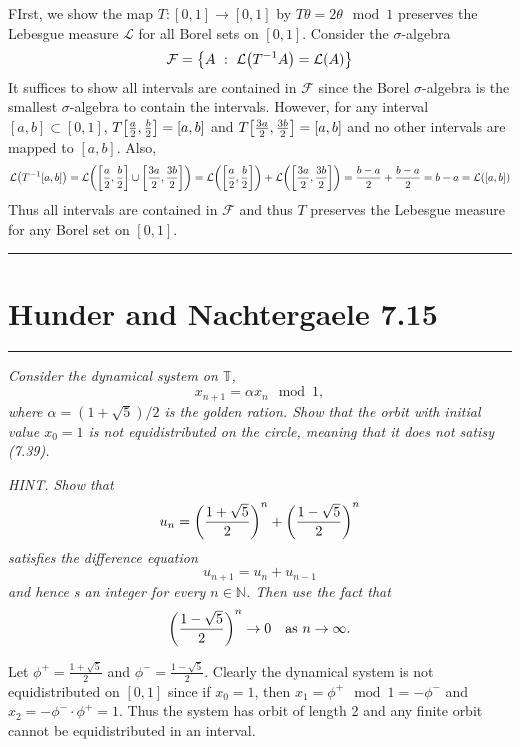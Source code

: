 \documentclass{article} %
\theoremstyle{plain}
\newcommand{\problem}[1]{
\vspace{.375cm}
\begin{minipage}{\textwidth}
    \begin{center}
        \noindent\rule{5cm}{1pt}
    \end{center}
    \section{\bf #1}
    \begin{center}
        \noindent\rule{5cm}{1pt}
    \end{center}
    \vspace{0.25cm}
\end{minipage}
}
\numberwithin{equation}{section} %
\numberwithin{figure}{section} %
\numberwithin{table}{section} %
\begin{document}
FIrst, we show the map $T: [0,1] \rightarrow [0,1]$ by $T\theta = 2\theta \mod 1$ preserves the Lebesgue measure $\mathcal{L}$ for all Borel sets on $[0,1]$.  Consider the $\sigma$-algebra
\begin{align*}
    \mathcal{F} = \left\{A\ :\ \mathcal{L}\qty(T^{-1}A) = \mathcal{L}\qty(A)\right\}
\end{align*}
It suffices to show all intervals are contained in $\mathcal{F}$ since the Borel $\sigma$-algebra is the smallest $\sigma$-algebra to contain the intervals.  However, for any interval $[a,b] \subset [0,1]$, $T\qty[\frac{a}{2}, \frac{b}{2}] = [a, b]$ and $T\qty[\frac{3a}{2}, \frac{3b}{2}] = [a,b]$ and no other intervals are mapped to $[a,b]$.  Also,
\begin{align*}
    \mathcal{L}\qty(T^{-1}[a,b]) = \mathcal{L}\qty(\qty[\frac{a}{2}, \frac{b}{2}] \cup \qty[\frac{3a}{2}, \frac{3b}{2}]) = \mathcal{L}\qty(\qty[\frac{a}{2}, \frac{b}{2}]) + \mathcal{L}\qty(\qty[\frac{3a}{2}, \frac{3b}{2}]) = \frac{b-a}{2} + \frac{b-a}{2} = b - a = \mathcal{L}\qty([a,b])
\end{align*}
Thus all intervals are contained in $\mathcal{F}$ and thus $T$ preserves the Lebesgue measure for any Borel set on $[0,1]$.

\problem{Hunder and Nachtergaele 7.15}
\emph{Consider the dynamical system on $\mathbb{T}$, $$x_{n+1} = \alpha x_n \mod 1,$$ where $\alpha = (1 + \sqrt{5})/2$ is the golden ration.  Show that the orbit with initial value $x_0 = 1$ is not equidistributed on the circle, meaning that it does not satisy (7.39).}

\emph{HINT.  Show that $$u_n = \qty(\frac{1 + \sqrt{5}}{2})^n + \qty(\frac{1 - \sqrt{5}}{2})^n$$ satisfies the difference equation $$u_{n+1} = u_n + u_{n-1}$$ and hence s an integer for every $n \in \mathbb{N}$.  Then use the fact that $$\qty(\frac{1 - \sqrt{5}}{2})^n \rightarrow 0\ \ \text{ as } n \rightarrow \infty.$$}

Let $\phi^+ = \frac{1 + \sqrt{5}}{2}$ and $\phi^- = \frac{1- \sqrt{5}}{2}$.  Clearly the dynamical system is not equidistributed on $[0,1]$ since if $x_0 = 1$, then $x_1 = \phi^+ \mod 1 = -\phi^-$ and $x_2 = -\phi^-\cdot \phi^+ = 1$.  Thus the system has orbit of length 2 and any finite orbit cannot be equidistributed in an interval. \\
\end{document}
